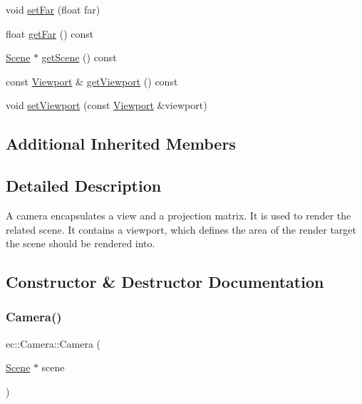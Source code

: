 \begin{DoxyCompactItemize}
void \mbox{\hyperlink{classec_1_1_camera_abdc800333490ec4f890559951340bd08}{set\+Far}} (float far)
\item 
float \mbox{\hyperlink{classec_1_1_camera_a6555d47e1c17caf67cf8683b4cbaca4b}{get\+Far}} () const
\item 
\mbox{\hyperlink{classec_1_1_scene}{Scene}} $\ast$ \mbox{\hyperlink{classec_1_1_camera_a33ad8a16eff39b34db86c6dbf2bbabe4}{get\+Scene}} () const
\item 
const \mbox{\hyperlink{classec_1_1_viewport}{Viewport}} \& \mbox{\hyperlink{classec_1_1_camera_adb2920a7a634aadcaca579eaf3fc1ad0}{get\+Viewport}} () const
\item 
void \mbox{\hyperlink{classec_1_1_camera_a3fc6f03041f6c0ee897c9596039d424d}{set\+Viewport}} (const \mbox{\hyperlink{classec_1_1_viewport}{Viewport}} \&viewport)
\end{DoxyCompactItemize}
\subsection*{Additional Inherited Members}


\subsection{Detailed Description}
A camera encapsulates a view and a projection matrix. It is used to render the related scene. It contains a viewport, which defines the area of the render target the scene should be rendered into. 

\subsection{Constructor \& Destructor Documentation}
\mbox{\label{classec_1_1_camera_a5b8034c32e082171bdb61033781cdcc3}} 
\subsubsection{\texorpdfstring{Camera()}{Camera()}\hspace{0.1cm}{\footnotesize\ttfamily [1/2]}}
{\footnotesize\ttfamily ec\+::\+Camera\+::\+Camera (\begin{DoxyParamCaption}\item[{\mbox{\hyperlink{classec_1_1_scene}{Scene}} $\ast$}]{scene }\end{DoxyParamCaption})\hspace{0.3cm}{\ttfamily [explicit]}}

